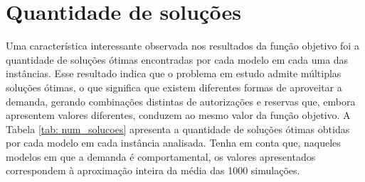 \section{Quantidade de soluções}
Uma característica interessante observada nos resultados da função objetivo foi a quantidade de soluções ótimas encontradas por cada modelo em cada uma das instâncias. Esse resultado indica que o problema em estudo admite múltiplas soluções ótimas, o que significa que existem diferentes formas de aproveitar a demanda, gerando combinações distintas de autorizações e reservas que, embora apresentem valores diferentes, conduzem ao mesmo valor da função objetivo. A Tabela \ref{tab: num_solucoes} apresenta a quantidade de soluções ótimas obtidas por cada modelo em cada instância analisada. Tenha em conta que, naqueles modelos em que a demanda é comportamental, os valores apresentados correspondem à aproximação inteira da média das 1000 simulações.

